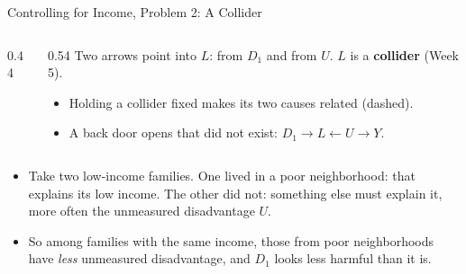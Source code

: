 \documentclass[aspectratio=169,11pt,xcolor=dvipsnames]{beamer}
\begin{document}
\begin{frame}{Controlling for Income, Problem 2: A Collider}
\begin{columns}[c]
\begin{column}{0.44\linewidth}
\begin{center}
\end{center}
\end{column}
\begin{column}{0.54\linewidth}
Two arrows point into $L$: from $D_1$ and from $U$. $L$ is a \textbf{collider} (Week 5).
\begin{itemize}\itemsep4pt
  \item Holding a collider fixed makes its two causes related (dashed).
  \item A back door opens that did not exist: $D_1 \to L \leftarrow U \to Y$.
\end{itemize}
\end{column}
\end{columns}
\vskip6pt
\begin{itemize}\itemsep4pt
  \item Take two low-income families. One lived in a poor neighborhood: that explains its low
        income. The other did not: something else must explain it, more often the unmeasured
        disadvantage $U$.
  \item So among families with the same income, those from poor neighborhoods have \emph{less}
        unmeasured disadvantage, and $D_1$ looks less harmful than it is.
\end{itemize}
\end{frame}
\end{document}
